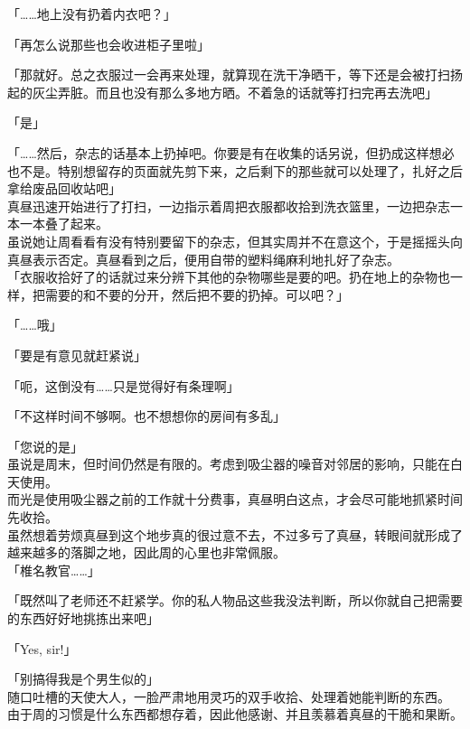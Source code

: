 「……地上没有扔着内衣吧？」

「再怎么说那些也会收进柜子里啦」

「那就好。总之衣服过一会再来处理，就算现在洗干净晒干，等下还是会被打扫扬起的灰尘弄脏。而且也没有那么多地方晒。不着急的话就等打扫完再去洗吧」

「是」

「……然后，杂志的话基本上扔掉吧。你要是有在收集的话另说，但扔成这样想必也不是。特别想留存的页面就先剪下来，之后剩下的那些就可以处理了，扎好之后拿给废品回收站吧」\\

真昼迅速开始进行了打扫，一边指示着周把衣服都收拾到洗衣篮里，一边把杂志一本一本叠了起来。\\

虽说她让周看看有没有特别要留下的杂志，但其实周并不在意这个，于是摇摇头向真昼表示否定。真昼看到之后，便用自带的塑料绳麻利地扎好了杂志。\\

「衣服收拾好了的话就过来分辨下其他的杂物哪些是要的吧。扔在地上的杂物也一样，把需要的和不要的分开，然后把不要的扔掉。可以吧？」

「……哦」

「要是有意见就赶紧说」

「呃，这倒没有……只是觉得好有条理啊」

「不这样时间不够啊。也不想想你的房间有多乱」

「您说的是」\\

虽说是周末，但时间仍然是有限的。考虑到吸尘器的噪音对邻居的影响，只能在白天使用。\\

而光是使用吸尘器之前的工作就十分费事，真昼明白这点，才会尽可能地抓紧时间先收拾。\\

虽然想着劳烦真昼到这个地步真的很过意不去，不过多亏了真昼，转眼间就形成了越来越多的落脚之地，因此周的心里也非常佩服。\\

「椎名教官……」

「既然叫了老师还不赶紧学。你的私人物品这些我没法判断，所以你就自己把需要的东西好好地挑拣出来吧」

「Yes, sir!」

「别搞得我是个男生似的」\\

随口吐槽的天使大人，一脸严肃地用灵巧的双手收拾、处理着她能判断的东西。\\

由于周的习惯是什么东西都想存着，因此他感谢、并且羡慕着真昼的干脆和果断。\\

